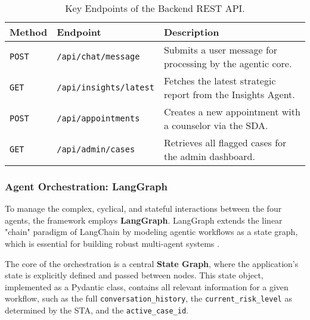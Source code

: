 \begin{table}[h]
    \centering
    \caption{Key Endpoints of the Backend REST API.}
    \label{tab:api_endpoints}
    \begin{tabular}{lll}
        \toprule
        \textbf{Method} & \textbf{Endpoint} & \textbf{Description} \\
        \midrule
        \texttt{POST} & \texttt{/api/chat/message} & Submits a user message for processing by the agentic core. \\
        \texttt{GET} & \texttt{/api/insights/latest} & Fetches the latest strategic report from the Insights Agent. \\
        \texttt{POST} & \texttt{/api/appointments} & Creates a new appointment with a counselor via the SDA. \\
        \texttt{GET} & \texttt{/api/admin/cases} & Retrieves all flagged cases for the admin dashboard. \\
        \bottomrule
    \end{tabular}
\end{table}

\subsubsection{Agent Orchestration: LangGraph}

To manage the complex, cyclical, and stateful interactions between the four agents, the framework employs \textbf{LangGraph}. LangGraph extends the linear "chain" paradigm of LangChain by modeling agentic workflows as a state graph, which is essential for building robust multi-agent systems \cite{FIND_CITATION_HERE}.

The core of the orchestration is a central \textbf{State Graph}, where the application's state is explicitly defined and passed between nodes. This state object, implemented as a Pydantic class, contains all relevant information for a given workflow, such as the full \texttt{conversation\_history}, the \texttt{current\_risk\_level} as determined by the STA, and the \texttt{active\_case\_id}. 

